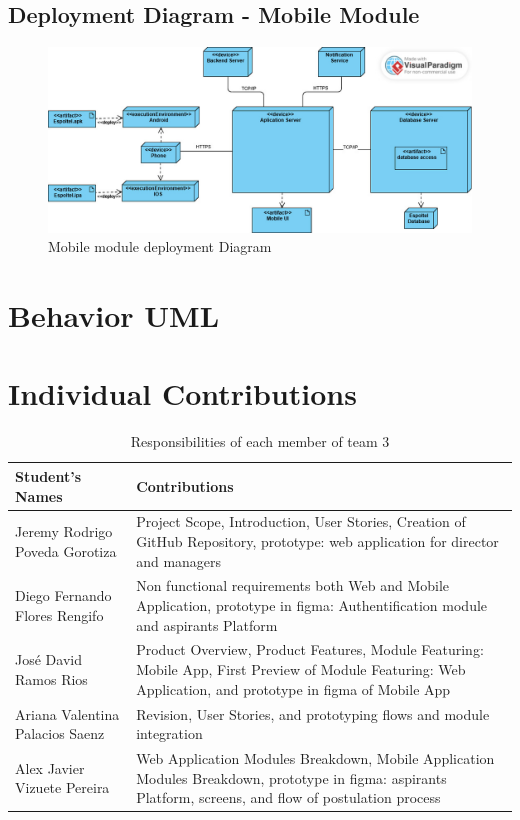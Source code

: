 \documentclass{scrreprt}
\begin{document}
\section{Deployment Diagram - Mobile Module}
\begin{figure}[H]
	\centering  \small
	\includegraphics[width=\textwidth]{DPL/DPL2.jpeg} 
	\caption{Mobile module deployment Diagram}
	\label{fig:DPL2}
\end{figure}
\chapter{Behavior UML}



    
\chapter{Individual Contributions}
\vspace{2cm}

\begin{table}[h!]
    \centering \small
    \renewcommand{\arraystretch}{1.5} %
    \begin{tabular}{|p{5cm}|p{10cm}|} %
    \hline
    \textbf{Student's Names} & \textbf{Contributions} \\ \hline
    Jeremy Rodrigo Poveda Gorotiza & Project Scope, Introduction, User Stories, Creation of GitHub Repository, prototype: web application for director and managers \\ \hline
    Diego Fernando Flores Rengifo & Non functional requirements both Web and Mobile Application, prototype in figma: Authentification module and aspirants Platform  \\ \hline
    José David Ramos Rios & Product Overview, Product Features, Module Featuring: Mobile App, First Preview of Module Featuring: Web Application, and prototype in figma of Mobile App \\ \hline
    Ariana Valentina Palacios Saenz & Revision, User Stories, and prototyping flows and module integration\\ \hline
    Alex Javier Vizuete Pereira & Web Application Modules Breakdown, Mobile Application Modules Breakdown, prototype in figma: aspirants Platform, screens, and flow of postulation process\\ \hline
    \end{tabular}
    \caption{Responsibilities of each member of team 3}
\end{table} \FloatBarrier 
\end{document}
